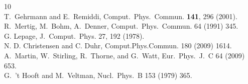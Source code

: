 \begin{thebibliography}{10}
\\
    T.~Gehrmann and E.~Remiddi, Comput.~Phys.~Commun. {\bf 141}, 296 (2001).
\\
R.~Mertig, M.~Bohm, A.~Denner, Comput.~Phys.~Commun. 64 (1991) 345.
\\
G. Lepage, J.~Comput.~Phys. 27, 192 (1978).
\\
N. D. Christensen and C. Duhr, Comput.Phys.Commun. 180 (2009) 1614. 
\\
A.~Martin, W.~Stirling, R.~Thorne, and G.~Watt, Eur.~Phys.~J.~C 64 (2009) 653.
\\
G.~'t Hooft and M.~Veltman, Nucl.~Phys.~B 153 (1979) 365.

\end{thebibliography}
